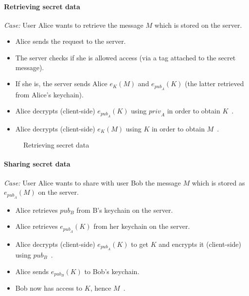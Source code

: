 \documentclass[a4paper, english]{report}
\begin{document}
\paragraph{Retrieving secret data}

\emph{Case:} User Alice wants to retrieve the message $M$ which is stored on the server.
\begin{itemize}
\item Alice sends the request to the server.
\item The server checks if she is allowed access (via a tag attached to the secret message).
\item If she is, the server sends Alice $e_K(M)$ and $e_{{pub}_A}(K)$ (the latter retrieved from Alice's keychain).
\item Alice decrypts (client-side) $e_{{pub}_A}(K)$ using ${priv}_A$ in order to obtain $K$~.
\item Alice decrypts (client-side) $e_{K}(M)$ using $K$ in order to obtain $M$~.
\end{itemize}

\begin{figure}[!h]
\centering
{}
\label{retrieving_secret_data}
\caption{Retrieving secret data}
\end{figure}

\paragraph{Sharing secret data}

\emph{Case:} User Alice wants to share with user Bob the message $M$ which is stored as $e_{{pub}_A}(M)$ on the server.
\begin{itemize}
\item Alice retrieves $pub_B$ from B's keychain on the server.
\item Alice retrieves $e_{{pub}_A}(K)$ from her keychain on the server.
\item Alice decrypts (client-side) $e_{{pub}_A}(K)$ to get $K$ and encrypts it (client-side) using $pub_B$~.
\item Alice sends $e_{pub_B}(K)$ to Bob's keychain.
\item Bob now has access to $K$, hence $M$~.
\end{itemize}
\end{document}
